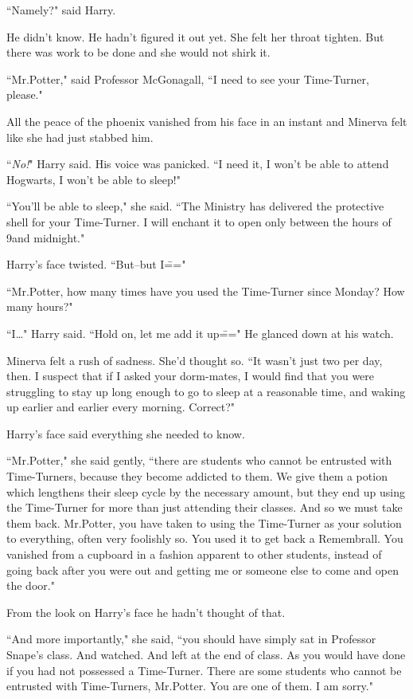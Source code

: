 ``Namely?" said Harry.

He didn't know. He hadn't figured it out yet. She felt her throat tighten. But there was work to be done and she would not shirk it.

``Mr.\?Potter," said Professor McGonagall, ``I need to see your Time-Turner, please."

All the peace of the phoenix vanished from his face in an instant and Minerva felt like she had just stabbed him.

``\emph{No!}" Harry said. His voice was panicked. ``I need it, I won't be able to attend Hogwarts, I won't be able to sleep!"

``You'll be able to sleep," she said. ``The Ministry has delivered the protective shell for your Time-Turner. I will enchant it to open only between the hours of 9\pm and midnight."

Harry's face twisted. ``But\---but I\==="

``Mr.\?Potter, how many times have you used the Time-Turner since Monday? How many hours?"

``I{\ldots}" Harry said. ``Hold on, let me add it up\===" He glanced down at his watch.

Minerva felt a rush of sadness. She'd thought so. ``It wasn't just two per day, then. I suspect that if I asked your dorm-mates, I would find that you were struggling to stay up long enough to go to sleep at a reasonable time, and waking up earlier and earlier every morning. Correct?"

Harry's face said everything she needed to know.

``Mr.\?Potter," she said gently, ``there are students who cannot be entrusted with Time-Turners, because they become addicted to them. We give them a potion which lengthens their sleep cycle by the necessary amount, but they end up using the Time-Turner for more than just attending their classes. And so we must take them back. Mr.\?Potter, you have taken to using the Time-Turner as your solution to everything, often very foolishly so. You used it to get back a Remembrall. You vanished from a cupboard in a fashion apparent to other students, instead of going back after you were out and getting me or someone else to come and open the door."

From the look on Harry's face he hadn't thought of that.

``And more importantly," she said, ``you should have simply sat in Professor Snape's class. And watched. And left at the end of class. As you would have done if you had not possessed a Time-Turner. There are some students who cannot be entrusted with Time-Turners, Mr.\?Potter. You are one of them. I am sorry."

